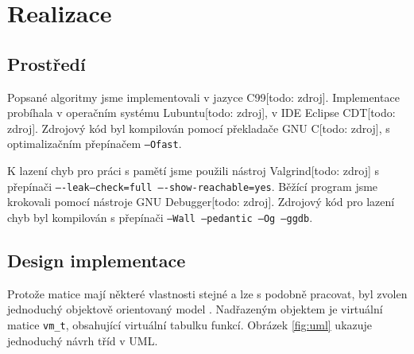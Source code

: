 \chapter{Realizace}

\section{Prostředí}

Popsané algoritmy jsme implementovali v jazyce C99[todo: zdroj]. Implementace probíhala v operačním systému Lubuntu[todo: zdroj], v IDE Eclipse CDT[todo: zdroj]. Zdrojový kód byl kompilován pomocí překladače GNU C[todo: zdroj], s optimalizačním přepínačem \texttt{--Ofast}.

K lazení chyb pro práci s pamětí jsme použili nástroj Valgrind[todo: zdroj] s přepínači \texttt{----leak--check=full ----show-reachable=yes}. Běžící program jsme krokovali pomocí nástroje GNU Debugger[todo: zdroj]. Zdrojový kód pro lazení chyb byl kompilován s přepínači \texttt{--Wall --pedantic --Og --ggdb}.


\section{Design implementace}

Protože matice mají některé vlastnosti stejné a lze s podobně pracovat, byl zvolen jednoduchý objektově orientovaný model \cite{schreiner1994objektorientierte}. Nadřazeným objektem je virtuální matice \texttt{vm\_t}, obsahující virtuální tabulku funkcí. Obrázek \ref{fig:uml} ukazuje jednoduchý návrh tříd v UML.
	
